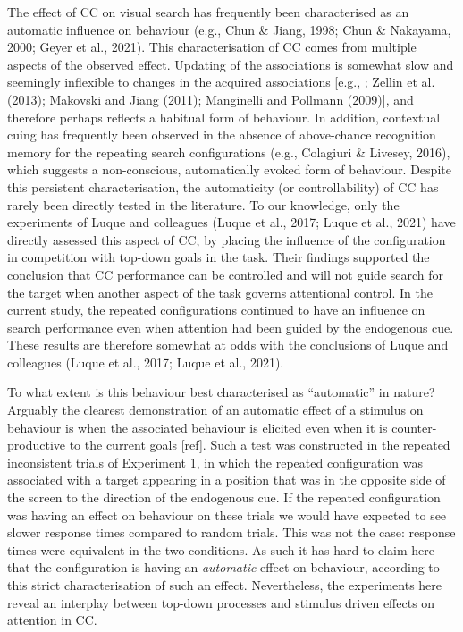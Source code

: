 \documentclass[
  man,floatsintext]{apa7}
\begin{document}
The effect of CC on visual search has frequently been characterised as an automatic influence on behaviour (e.g., Chun \& Jiang, 1998; Chun \& Nakayama, 2000; Geyer et al., 2021). This characterisation of CC comes from multiple aspects of the observed effect. Updating of the associations is somewhat slow and seemingly inflexible to changes in the acquired associations {[}e.g., ; Zellin et al. (2013); Makovski and Jiang (2011); Manginelli and Pollmann (2009){]}, and therefore perhaps reflects a habitual form of behaviour. In addition, contextual cuing has frequently been observed in the absence of above-chance recognition memory for the repeating search configurations (e.g., Colagiuri \& Livesey, 2016), which suggests a non-conscious, automatically evoked form of behaviour. Despite this persistent characterisation, the automaticity (or controllability) of CC has rarely been directly tested in the literature. To our knowledge, only the experiments of Luque and colleagues (Luque et al., 2017; Luque et al., 2021) have directly assessed this aspect of CC, by placing the influence of the configuration in competition with top-down goals in the task. Their findings supported the conclusion that CC performance can be controlled and will not guide search for the target when another aspect of the task governs attentional control. In the current study, the repeated configurations continued to have an influence on search performance even when attention had been guided by the endogenous cue. These results are therefore somewhat at odds with the conclusions of Luque and colleagues (Luque et al., 2017; Luque et al., 2021).

To what extent is this behaviour best characterised as ``automatic'' in nature? Arguably the clearest demonstration of an automatic effect of a stimulus on behaviour is when the associated behaviour is elicited even when it is counter-productive to the current goals {[}ref{]}. Such a test was constructed in the repeated inconsistent trials of Experiment 1, in which the repeated configuration was associated with a target appearing in a position that was in the opposite side of the screen to the direction of the endogenous cue. If the repeated configuration was having an effect on behaviour on these trials we would have expected to see slower response times compared to random trials. This was not the case: response times were equivalent in the two conditions. As such it has hard to claim here that the configuration is having an \emph{automatic} effect on behaviour, according to this strict characterisation of such an effect. Nevertheless, the experiments here reveal an interplay between top-down processes and stimulus driven effects on attention in CC.
\end{document}

